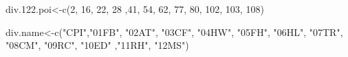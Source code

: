 \documentclass[
]{article}
\newenvironment{Shaded}{\begin{snugshade}}{\end{snugshade}}
\newcommand{\DecValTok}[1]{\textcolor[rgb]{0.00,0.00,0.81}{#1}}
\newcommand{\FloatTok}[1]{\textcolor[rgb]{0.00,0.00,0.81}{#1}}
\newcommand{\FunctionTok}[1]{\textcolor[rgb]{0.00,0.00,0.00}{#1}}
\newcommand{\NormalTok}[1]{#1}
\newcommand{\OtherTok}[1]{\textcolor[rgb]{0.56,0.35,0.01}{#1}}
\newcommand{\StringTok}[1]{\textcolor[rgb]{0.31,0.60,0.02}{#1}}
\begin{document}
\begin{Shaded}
\begin{Highlighting}[]
\NormalTok{div.}\FloatTok{122.}\NormalTok{poi}\OtherTok{\textless{}{-}}\FunctionTok{c}\NormalTok{(}\DecValTok{2}\NormalTok{, }\DecValTok{16}\NormalTok{, }\DecValTok{22}\NormalTok{, }\DecValTok{28}\NormalTok{ ,}\DecValTok{41}\NormalTok{,  }\DecValTok{54}\NormalTok{,  }\DecValTok{62}\NormalTok{, }\DecValTok{77}\NormalTok{, }\DecValTok{80}\NormalTok{,  }\DecValTok{102}\NormalTok{, }\DecValTok{103}\NormalTok{, }\DecValTok{108}\NormalTok{)}

\NormalTok{div.name}\OtherTok{\textless{}{-}}\FunctionTok{c}\NormalTok{(}\StringTok{"CPI"}\NormalTok{,}\StringTok{"01FB"}\NormalTok{, }\StringTok{"02AT"}\NormalTok{, }\StringTok{"03CF"}\NormalTok{, }\StringTok{"04HW"}\NormalTok{, }\StringTok{"05FH"}\NormalTok{, }\StringTok{"06HL"}\NormalTok{, }\StringTok{"07TR"}\NormalTok{, }\StringTok{"08CM"}\NormalTok{, }\StringTok{"09RC"}\NormalTok{, }\StringTok{"10ED"}\NormalTok{ ,}\StringTok{"11RH"}\NormalTok{, }\StringTok{"12MS"}\NormalTok{)}
\end{Highlighting}
\end{Shaded}
\end{document}
